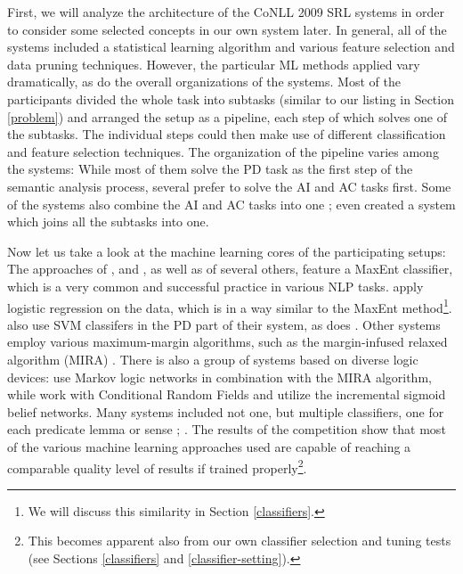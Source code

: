 \documentclass[12pt,notitlepage]{report}
\begin{document}
First, we will analyze the architecture of the CoNLL 2009 SRL systems in order to consider some selected concepts in our own system later. In general, all of the systems included a statistical learning algorithm and various feature selection and data pruning techniques. However, the particular ML methods applied vary dramatically, as do the overall organizations of the systems. Most of the participants divided the whole task into subtasks (similar to our listing in Section \ref{problem}) and arranged the setup as a pipeline, each step of which solves one of the subtasks. The individual steps could then make use of different classification and feature selection techniques. The organization of the pipeline varies among the systems: While most of them solve the PD task as the first step of the semantic analysis process, several \citep{bohnet09,zhao09} prefer to solve the AI and AC tasks first. Some of the systems also combine the AI and AC tasks into one \citep{che09,nugues09}; \citet{meza-ruiz09} even created a system which joins all the subtasks into one. 

Now let us take a look at the machine learning cores of the participating setups: The approaches of \citet{zhao09}, \citet{che09} and \citet{chen09}, as well as of several others, feature a MaxEnt classifier, which is a very common and successful practice in various NLP tasks. \citet{nugues09} apply logistic regression on the data, which is in a way similar to the MaxEnt method\footnote{We will discuss this similarity in Section \ref{classifiers}.}. \citet{che09} also use SVM classifers in the PD part of their system, as does \citet{tackstrom09}. Other systems \citep{bohnet09,asahara09} employ various maximum-margin algorithms, such as the margin-infused relaxed algorithm (MIRA) \citep{crammer03}. There is also a group of systems based on diverse logic devices: \citet{meza-ruiz09} use Markov logic networks in combination with the MIRA algorithm, while \citet{moreau09} work with Conditional Random Fields and \citet{merlo09} utilize the incremental sigmoid belief networks. Many systems included not one, but multiple classifiers, one for each predicate lemma or sense \citep{che09}; \citep{nugues09}. The results of the competition show that most of the various machine learning approaches used are capable of reaching a comparable quality level of results if trained properly\footnote{This becomes apparent also from our own classifier selection and tuning tests (see Sections \ref{classifiers} and \ref{classifier-setting}).}.
\end{document}
